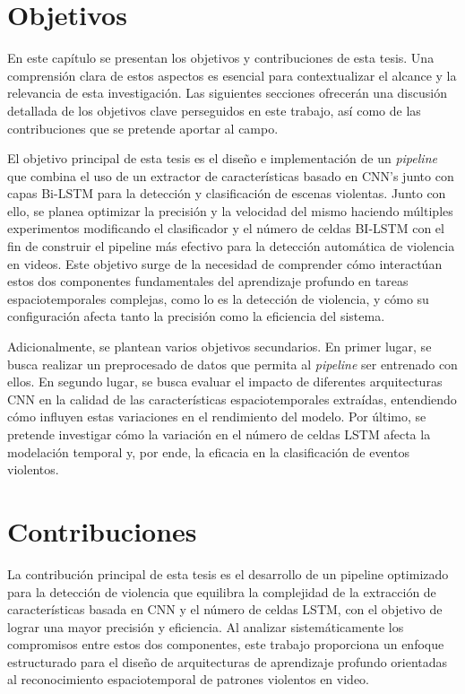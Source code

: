 \section{Objetivos}

En este capítulo se presentan los objetivos y contribuciones 
de esta tesis. Una comprensión clara de estos aspectos es 
esencial para contextualizar el alcance y la relevancia de 
esta investigación. Las siguientes secciones ofrecerán una 
discusión detallada de los objetivos clave perseguidos en este 
trabajo, así como de las contribuciones que se pretende 
aportar al campo.

El objetivo principal de esta tesis es el diseño e 
implementación de un \textit{pipeline} que combina el uso de un 
extractor de características basado en CNN's junto con capas 
Bi-LSTM para la detección y clasificación de escenas violentas. 
Junto con ello, se planea optimizar la precisión y la velocidad 
del mismo haciendo múltiples experimentos modificando el 
clasificador y el número de celdas BI-LSTM
con el fin de construir el pipeline más efectivo para la 
detección automática de violencia en videos. Este objetivo 
surge de la necesidad de comprender cómo interactúan estos 
dos componentes fundamentales del aprendizaje profundo en 
tareas espaciotemporales complejas, como lo es la detección 
de violencia, y cómo su configuración afecta tanto la 
precisión como la eficiencia del sistema.

Adicionalmente, se plantean varios objetivos secundarios. 
En primer lugar, se busca realizar un preprocesado de datos 
que permita al \textit{pipeline} ser entrenado con ellos. 
En segundo lugar, se busca evaluar el impacto de diferentes 
arquitecturas CNN en la calidad de las características 
espaciotemporales extraídas, entendiendo cómo influyen 
estas variaciones en el rendimiento del modelo. Por último, 
se pretende investigar cómo la variación en el número 
de celdas LSTM afecta la modelación temporal y, por ende, 
la eficacia en la clasificación de eventos violentos.

\section{Contribuciones}

La contribución principal de esta tesis es el desarrollo 
de un pipeline optimizado para la detección de violencia 
que equilibra la complejidad de la extracción de 
características basada en CNN y el número de celdas LSTM, 
con el objetivo de lograr una mayor precisión y eficiencia. 
Al analizar sistemáticamente los compromisos entre estos 
dos componentes, este trabajo proporciona un enfoque 
estructurado para el diseño de arquitecturas de aprendizaje 
profundo orientadas al reconocimiento espaciotemporal de 
patrones violentos en video.

